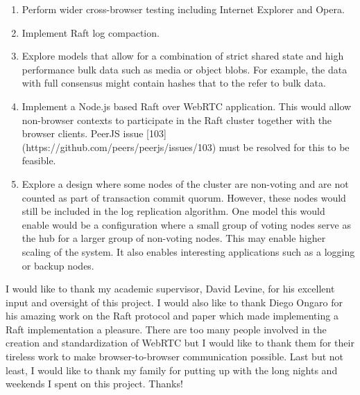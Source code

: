 \documentclass{acmtog} %
\begin{document}
\begin{enumerate}
\item Perform wider cross-browser testing including Internet Explorer and
  Opera.
\item Implement Raft log compaction.
\item Explore models that allow for a combination of strict shared state
  and high performance bulk data such as media or object blobs. For
  example, the data with full consensus might contain hashes that to
  the refer to bulk data.
\item Implement a Node.js based Raft over WebRTC application. This would
  allow non-browser contexts to participate in the Raft cluster
  together with the browser clients. PeerJS issue
  [103](https://github.com/peers/peerjs/issues/103) must be resolved
  for this to be feasible.
\item Explore a design where some nodes of the cluster are non-voting and
  are not counted as part of transaction commit quorum. However, these
  nodes would still be included in the log replication algorithm. One
  model this would enable would be a configuration where a small group
  of voting nodes serve as the hub for a larger group of non-voting
  nodes. This may enable higher scaling of the system. It also enables
  interesting applications such as a logging or backup nodes.
\end{enumerate}


\begin{acks}
I would like to thank my academic supervisor, David Levine, for his
excellent input and oversight of this project. I would also like to
thank Diego Ongaro for his amazing work on the Raft protocol and paper
which made implementing a Raft implementation a pleasure. There are
too many people involved in the creation and standardization of WebRTC
but I would like to thank them for their tireless work to make
browser-to-browser communication possible. Last but not least, I would
like to thank my family for putting up with the long nights and
weekends I spent on this project. Thanks!
\end{acks}





\end{document}
